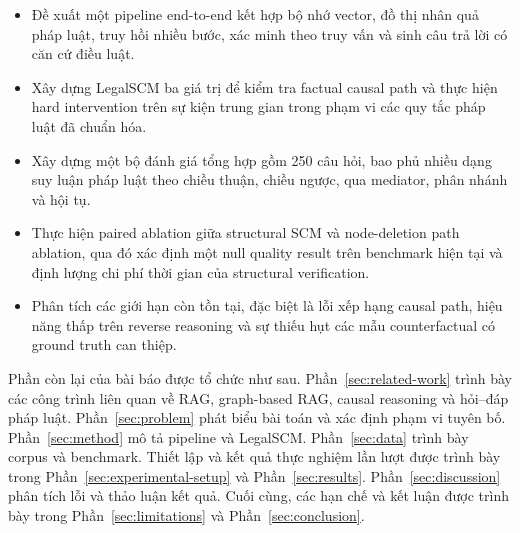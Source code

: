 \begin{itemize}
    \item Đề xuất một pipeline end-to-end kết hợp bộ nhớ vector, đồ thị nhân
    quả pháp luật, truy hồi nhiều bước, xác minh theo truy vấn và sinh câu
    trả lời có căn cứ điều luật.

    \item Xây dựng LegalSCM ba giá trị để kiểm tra factual causal path và
    thực hiện hard intervention trên sự kiện trung gian trong phạm vi các
    quy tắc pháp luật đã chuẩn hóa.

    \item Xây dựng một bộ đánh giá tổng hợp gồm 250 câu hỏi, bao phủ nhiều
    dạng suy luận pháp luật theo chiều thuận, chiều ngược, qua mediator,
    phân nhánh và hội tụ.

    \item Thực hiện paired ablation giữa structural SCM và node-deletion
    path ablation, qua đó xác định một null quality result trên benchmark
    hiện tại và định lượng chi phí thời gian của structural verification.

    \item Phân tích các giới hạn còn tồn tại, đặc biệt là lỗi xếp hạng causal
    path, hiệu năng thấp trên reverse reasoning và sự thiếu hụt các mẫu
    counterfactual có ground truth can thiệp.
\end{itemize}

Phần còn lại của bài báo được tổ chức như sau. Phần~\ref{sec:related-work}
trình bày các công trình liên quan về RAG, graph-based RAG, causal reasoning
và hỏi--đáp pháp luật. Phần~\ref{sec:problem} phát biểu bài toán và xác định
phạm vi tuyên bố. Phần~\ref{sec:method} mô tả pipeline và LegalSCM.
Phần~\ref{sec:data} trình bày corpus và benchmark. Thiết lập và kết quả thực
nghiệm lần lượt được trình bày trong Phần~\ref{sec:experimental-setup} và
Phần~\ref{sec:results}. Phần~\ref{sec:discussion} phân tích lỗi và thảo
luận kết quả. Cuối cùng, các hạn chế và kết luận được trình bày trong
Phần~\ref{sec:limitations} và Phần~\ref{sec:conclusion}.
